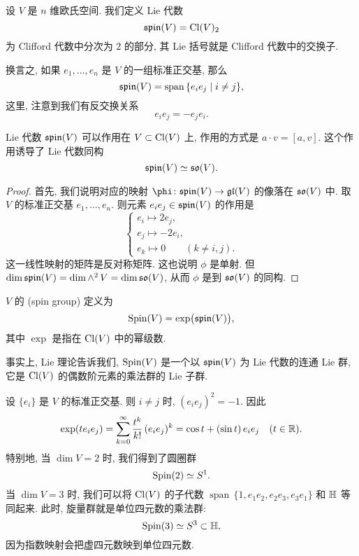\begin{definition}
    设 $V$ 是 $n$ 维欧氏空间. 我们定义 Lie 代数
    \[ \mathfrak{spin} (V) = \operatorname{Cl} (V)_2 \]
    为 Clifford 代数中分次为 $2$ 的部分, 其 Lie 括号就是 Clifford 代数中的交换子.
\end{definition}

换言之, 如果 $e_1, \dotsc, e_n$ 是 $V$ 的一组标准正交基, 那么
\[ \mathfrak{spin} (V) = \operatorname{span} {} \{ e_i e_j \mid i \neq j \}, \]
这里, 注意到我们有反交换关系 
\[ e_i e_j = -e_j e_i. \]

\begin{proposition} \label{thm-8-spin-alg-action}
    Lie 代数 $\mathfrak{spin} (V)$ 可以作用在 $V \subset \operatorname{Cl} (V)$ 上,
    作用的方式是 $a \cdot v = [a, v]$. 这个作用诱导了 Lie 代数同构
    \[ \mathfrak{spin} (V) \simeq \mathfrak{so} (V). \]
\end{proposition}

\begin{proof}
    首先, 我们说明对应的映射 $\phi \: \spin (V) \to \gl (V)$ 的像落在 $\mathfrak{so} (V)$ 中.
    取 $V$ 的标准正交基 $e_1, \dotsc, e_n$. 则元素 $e_i e_j \in \mathfrak{spin} (V)$ 的作用是
    \[ \left \{ \begin{array}{l}
        e_i \mapsto 2e_j, \\
        e_j \mapsto -2e_i, \\
        e_k \mapsto 0 \qquad (k \neq i, j).
    \end{array} \right . \]
    这一线性映射的矩阵是反对称矩阵. 这也说明 $\phi$ 是单射.
    但 $\dim \mathfrak{spin} (V) = \dim {\wedge^2 \, V} = \dim \mathfrak{so} (V)$,
    从而 $\phi$ 是到 $\mathfrak{so} (V)$ 的同构.
\end{proof}

\begin{definition}
    $V$ 的 (spin group) 定义为
    \[ \mathrm{Spin} (V) = \exp \bigl( \mathfrak{spin} (V) \bigr), \]
    其中 $\exp$ 是指在 $\operatorname{Cl} (V)$ 中的幂级数.
\end{definition}

事实上, Lie 理论告诉我们,
$\mathrm{Spin} (V)$ 是一个以 $\mathfrak{spin} (V)$ 为 Lie 代数的连通 Lie 群,
它是 $\operatorname{Cl} (V)$ 的偶数阶元素的乘法群的 Lie 子群.

\begin{example}
    设 $\{ e_i \}$ 是 $V$ 的标准正交基. 则 $i \neq j$ 时, $(e_i e_j)^2 = -1$. 因此
    \[ \exp ( t e_i e_j ) = \sum _{k=0} ^\infty \frac {t^k} {k!} \, (e_i e_j)^k
        = \cos t + (\sin t) \, e_i e_j \quad (t \in \mathbb{R}). \]
    特别地, 当 $\dim V = 2$ 时, 我们得到了圆圈群
    \[ \mathrm{Spin} (2) \simeq S^1. \]
    当 $\dim V = 3$ 时, 我们可以将 $\operatorname{Cl} (V)$ 的子代数
    $\operatorname{span} \, \{ 1, e_1 e_2, e_2 e_3, e_3 e_1 \}$ 和 $\mathbb{H}$ 等同起来.
    此时, 旋量群就是单位四元数的乘法群:
    \[ \mathrm{Spin} (3) \simeq S^3 \subset \mathbb{H}, \]
    因为指数映射会把虚四元数映到单位四元数. \varqed
\end{example}

